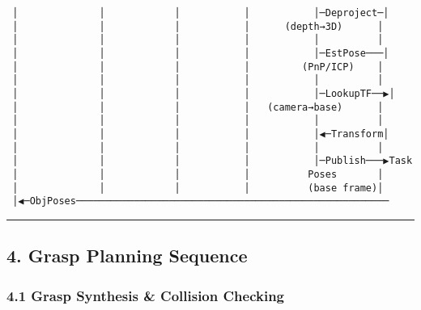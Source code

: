 \documentclass[
]{article}
\begin{document}
\begin{verbatim}
 │              │            │           │           │─Deproject─│
 │              │            │           │      (depth→3D)      │
 │              │            │           │           │          │
 │              │            │           │           │─EstPose───│
 │              │            │           │         (PnP/ICP)    │
 │              │            │           │           │          │
 │              │            │           │           │─LookupTF──▶│
 │              │            │           │   (camera→base)      │
 │              │            │           │           │          │
 │              │            │           │           │◀─Transform│
 │              │            │           │           │          │
 │              │            │           │           │─Publish───▶Task
 │              │            │           │          Poses       │
 │              │            │           │          (base frame)│
 │◀─ObjPoses──────────────────────────────────────────────────────
\end{verbatim}

\begin{center}\rule{0.5\linewidth}{0.5pt}\end{center}

\hypertarget{grasp-planning-sequence}{%
\subsection{4. Grasp Planning Sequence}\label{grasp-planning-sequence}}

\hypertarget{grasp-synthesis-collision-checking}{%
\subsubsection{4.1 Grasp Synthesis \& Collision
Checking}\label{grasp-synthesis-collision-checking}}
\end{document}
